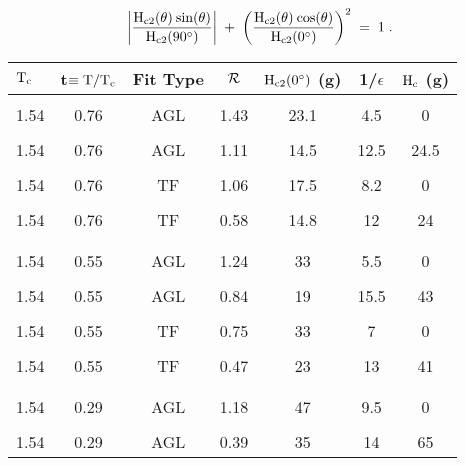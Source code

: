 {\newpage
\clearpage
\samepage \begin{figure}\vspace{5in}

\label{hcfig}
\end{figure}
}

{\newpage
\clearpage
\samepage \begin{equation}%
\label{tinkham}
\rm \left| \frac{H_{c2}(\theta) \: sin(\theta)}{H_{c2}(90^{\circ})} \right| \; + \;
\left( \frac{H_{c2}(\theta) \: cos(\theta)}{H_{c2}(0^{\circ})} \right)^2 \;
= \; 1 \; .
\end{equation}
}

{\newpage
\clearpage
\samepage \begin{table}
\label{residsum}
\begin{center}
\begin{tabular}{|l|cccccc|}
\hline
$\rm T_c$ & t$\rm \equiv T/T_c$ & Fit Type & $\cal R$ & $\rm H_{c2}(0^{\circ})$ (g)& 1/$\epsilon$ & $\rm H_c$ (g) \\ 
\hline
& & & & & & \\ 
1.54 &  0.76 & AGL &1.43 & 23.1 & 4.5 & 0 \\  
& & & & & & \\ 
1.54 &  0.76 & AGL &1.11 & 14.5   & 12.5& 24.5 \\ 
& & & & & & \\ 
1.54 &  0.76 &  TF & 1.06 & 17.5   & 8.2 & 0 \\ 
& & & & & & \\ 
1.54 &  0.76 &  TF & 0.58 & 14.8   & 12& 24 \\ 
& & & & & & \\ 
\hline
& & & & & & \\ 
1.54 & 0.55 &AGL & 1.24 & 33 & 5.5 & 0 \\ 
& & & & & & \\ 
1.54 & 0.55 &AGL & 0.84 & 19 & 15.5  & 43 \\ 
& & & & & & \\ 
1.54 & 0.55 &TF  & 0.75 & 33 &  7  &  0 \\ 
& & & & & & \\ 
1.54 & 0.55 &TF  & 0.47 & 23 & 13  & 41 \\ 
& & & & & & \\ 
\hline
& & & & & & \\ 
1.54 & 0.29 &AGL & 1.18 & 47 & 9.5  & 0 \\ 
& & & & & & \\ 
1.54 & 0.29 &AGL & 0.39 & 35 & 14  & 65 \\ 

\end{tabular}
\end{center}
\end{table}}
